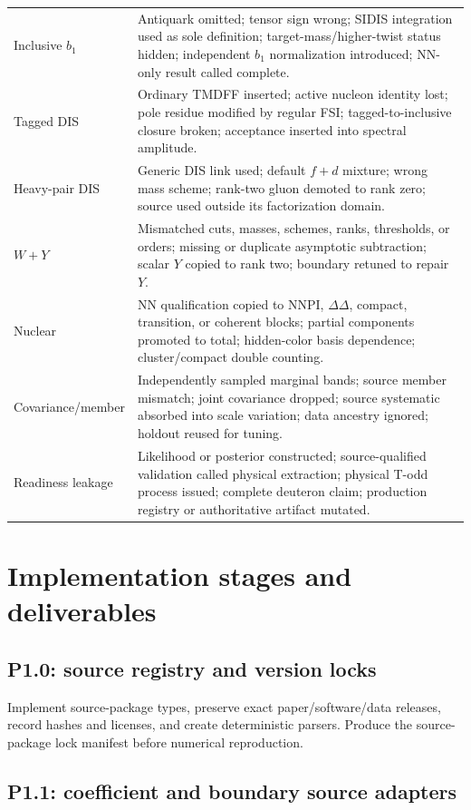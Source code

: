 \documentclass[11pt]{article}
\begin{document}
\begin{longtable}{L{0.27\textwidth}L{0.65\textwidth}}
Inclusive \(b_1\) & Antiquark omitted; tensor sign wrong; SIDIS integration used as sole definition; target-mass/higher-twist status hidden; independent \(b_1\) normalization introduced; NN-only result called complete.\\
Tagged DIS & Ordinary TMDFF inserted; active nucleon identity lost; pole residue modified by regular FSI; tagged-to-inclusive closure broken; acceptance inserted into spectral amplitude.\\
Heavy-pair DIS & Generic DIS link used; default \(f+d\) mixture; wrong mass scheme; rank-two gluon demoted to rank zero; source used outside its factorization domain.\\
\(W+Y\) & Mismatched cuts, masses, schemes, ranks, thresholds, or orders; missing or duplicate asymptotic subtraction; scalar \(Y\) copied to rank two; boundary retuned to repair \(Y\).\\
Nuclear & NN qualification copied to NNPI, \(\Delta\Delta\), compact, transition, or coherent blocks; partial components promoted to total; hidden-color basis dependence; cluster/compact double counting.\\
Covariance/member & Independently sampled marginal bands; source member mismatch; joint covariance dropped; source systematic absorbed into scale variation; data ancestry ignored; holdout reused for tuning.\\
Readiness leakage & Likelihood or posterior constructed; source-qualified validation called physical extraction; physical T-odd process issued; complete deuteron claim; production registry or authoritative artifact mutated.\\
\bottomrule
\end{longtable}

\section{Implementation stages and deliverables}
\label{sec:implementation}

\subsection{P1.0: source registry and version locks}

Implement source-package types, preserve exact paper/software/data releases, record hashes and licenses, and create deterministic parsers.  Produce the source-package lock manifest before numerical reproduction.

\subsection{P1.1: coefficient and boundary source adapters}
\end{document}
